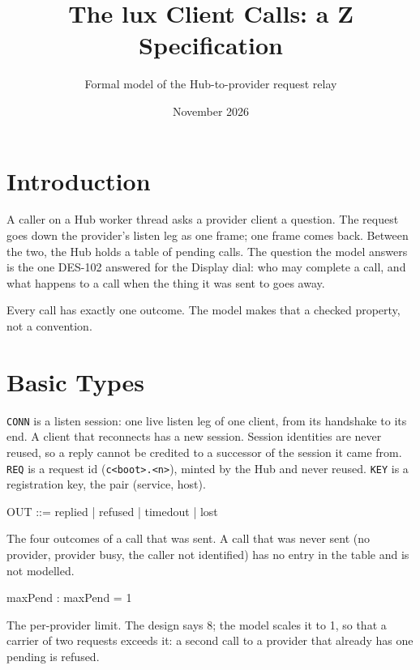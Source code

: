 \documentclass[a4paper,10pt,fleqn]{article}
\begin{document}
\title{The lux Client Calls: a Z Specification}
\author{Formal model of the Hub-to-provider request relay}
\date{November 2026}
\maketitle

\section{Introduction}

A caller on a Hub worker thread asks a provider client a question.  The
request goes down the provider's listen leg as one frame; one frame comes back.
Between the two, the Hub holds a table of pending calls.  The question the
model answers is the one DES-102 answered for the Display dial: who may
complete a call, and what happens to a call when the thing it was sent to
goes away.

Every call has exactly one outcome.  The model makes that a checked
property, not a convention.

\section{Basic Types}

\begin{zed}
\end{zed}

\texttt{CONN} is a listen session: one live listen leg of one client, from
its handshake to its end.  A client that reconnects has a new session.
Session identities are never reused, so a reply cannot be credited to a
successor of the session it came from.  \texttt{REQ} is a request id
(\texttt{c<boot>.<n>}), minted by the Hub and never reused.  \texttt{KEY} is
a registration key, the pair (service, host).

\begin{zed}
  OUT ::= replied | refused | timedout | lost
\end{zed}

The four outcomes of a call that was sent.  A call that was never sent (no
provider, provider busy, the caller not identified) has no entry in the
table and is not modelled.

\begin{axdef}
  maxPend : \nat
\where
  maxPend = 1
\end{axdef}

The per-provider limit.  The design says 8; the model scales it to 1, so
that a carrier of two requests exceeds it: a second call to a provider
that already has one pending is refused.
\end{document}
